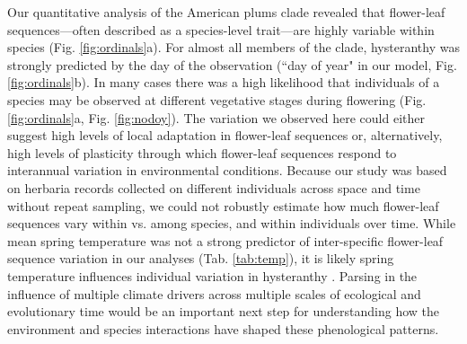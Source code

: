 \documentclass{article}[12pt]
\begin{document}
{{Our quantitative analysis of the American plums clade revealed that flower-leaf sequences---often described as a species-level trait---are highly variable within species (Fig. \ref{fig:ordinals}a). For almost all members of the clade, hysteranthy was strongly predicted by the day of the observation (``day of year" in our model, Fig. \ref{fig:ordinals}b). In many cases there was a high likelihood that individuals of a species may be observed at different vegetative stages during flowering (Fig. \ref{fig:ordinals}a, Fig. \ref{fig:nodoy}). %
The variation we observed here could either suggest high levels of local adaptation in flower-leaf sequences or, alternatively, high levels of plasticity through which flower-leaf sequences respond to interannual variation in environmental conditions. Because our study was based on herbaria records collected on different individuals across space and time without repeat sampling, we could not robustly estimate how much flower-leaf sequences vary within vs. among species, and within individuals over time. While mean spring temperature was not a strong predictor of inter-specific flower-leaf sequence variation in our analyses (Tab. \ref{tab:temp}), it is likely spring temperature influences individual variation in hysteranthy \citep{Guo:2023wb}. Parsing in the influence of multiple climate drivers across multiple scales of ecological and evolutionary time would be an important next step for understanding how the environment and species interactions have shaped these phenological patterns.

}}
\end{document}
